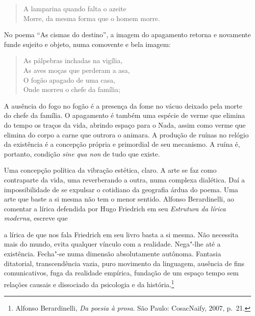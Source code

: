 \begin{verse}
A lamparina quando falta o azeite\\
Morre, da mesma forma que o homem morre.
\end{verse}

No poema “As cismas do destino”, a imagem do apagamento retorna e
novamente funde sujeito e objeto, numa comovente e bela imagem:

\begin{verse}
As pálpebras inchadas na vigília,\\
As aves moças que perderam a asa,\\
O fogão apagado de uma casa,\\
Onde morreu o chefe da família;
\end{verse}

A ausência do fogo no fogão é a presença da fome no vácuo deixado
pela morte do chefe da família. O apagamento é também uma espécie de
verme que elimina do tempo os traços da vida, abrindo espaço para o
Nada, assim como verme que elimina do corpo a carne que outrora o
animara. A produção de ruínas no relógio da existência é a concepção
própria e primordial de seu mecanismo. A ruína é, portanto, condição
\textit{sine qua non} de tudo que existe. 

Uma concepção política da vibração estética, claro. A arte se faz
como contraparte da vida, uma reverberando a outra, numa complexa
dialética. Daí a impossibilidade de se expulsar o cotidiano da
geografia árdua do poema. Uma arte que baste a si mesma não tem o menor
sentido. Alfonso Berardinelli, ao comentar a lírica defendida por Hugo
Friedrich em seu \textit{Estrutura da lírica moderna}, escreve que

\begin{hedraquote}
a lírica de que nos fala Friedrich em seu livro basta a si mesma. Não
necessita mais do mundo, evita qualquer vínculo com a realidade.
Nega"-lhe até a existência. Fecha"-se numa dimensão absolutamente
autônoma. Fantasia ditatorial, transcendência vazia, puro movimento da
linguagem, ausência de fins comunicativos, fuga da realidade empírica,
fundação de um espaço tempo sem relações causais e dissociado da
psicologia e da história.\footnote{Alfonso Berardinelli, \textit{Da poesia à prosa}. São Paulo:
CosacNaify, 2007, p.~21.}
\end{hedraquote}

